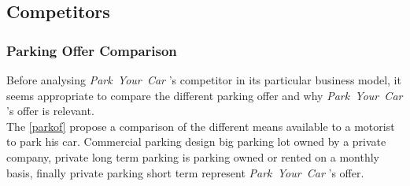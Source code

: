 \documentclass[12pt,a4paper,oneside]{book}
\newcommand{\bp}{\textit{Park~Your~Car }}
\begin{document}
\subsection{Competitors}
\subsubsection{Parking Offer Comparison}
Before analysing \bp 's competitor in its particular business model, it seems appropriate to compare the different parking offer and why \bp 's offer is relevant.\\

The \autoref{parkof} propose a comparison of the different means available to a motorist to park his car. Commercial parking design big parking lot owned by a private company, private long term parking is parking owned or rented on a monthly basis, finally private parking short term represent \bp 's offer.
\end{document}
